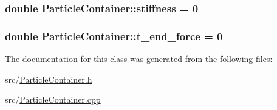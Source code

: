 \subsubsection[{\texorpdfstring{stiffness}{stiffness}}]{\setlength{\rightskip}{0pt plus 5cm}double Particle\+Container\+::stiffness = 0\hspace{0.3cm}{\ttfamily [protected]}}\hypertarget{classParticleContainer_a3a00b0487e24b68b5cedc29087221f00}{}\label{classParticleContainer_a3a00b0487e24b68b5cedc29087221f00}
\subsubsection[{\texorpdfstring{t\+\_\+end\+\_\+force}{t_end_force}}]{\setlength{\rightskip}{0pt plus 5cm}double Particle\+Container\+::t\+\_\+end\+\_\+force = 0\hspace{0.3cm}{\ttfamily [protected]}}\hypertarget{classParticleContainer_aaa12218c40cf5d8f2421d5cc09fcafc0}{}\label{classParticleContainer_aaa12218c40cf5d8f2421d5cc09fcafc0}


The documentation for this class was generated from the following files\+:\begin{DoxyCompactItemize}
\item 
src/\hyperlink{ParticleContainer_8h}{Particle\+Container.\+h}\item 
src/\hyperlink{ParticleContainer_8cpp}{Particle\+Container.\+cpp}\end{DoxyCompactItemize}
